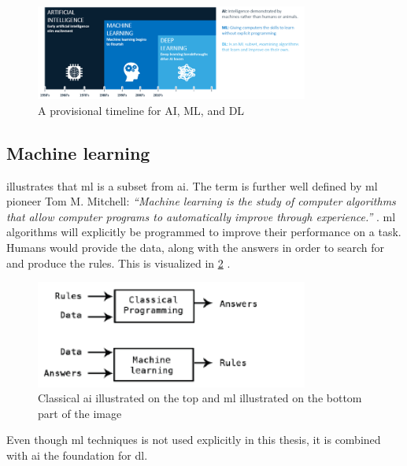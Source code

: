 \documentclass[USenglish]{ifimaster}  %
\begin{document}
\begin{figure}[ht]
    \centering
    \includegraphics[width=0.8\textwidth]{bilder/AI_ML_DL.png}
    \caption{A provisional timeline for AI, ML, and DL \cite{website:AI}}
    \label{fig:AI}
\end{figure}

\subsection{Machine learning}
 illustrates that \ac{ml} is a subset from \ac{ai}. The term is further well defined by \ac{ml} pioneer Tom M. Mitchell:
\newline
\newline
\textit{“Machine learning is the study of computer algorithms that allow computer programs to automatically improve through experience.”} \cite{tom_mitchell}.
\newline
\newline
\ac{ml} algorithms will explicitly be programmed to improve their performance on a task. Humans would provide the data, along with the answers in order to search for and produce the rules. This is visualized in \cref{fig:ml} \cite{Francois_Deep_learning_with_python}.
\begin{figure}[ht]
    \centering
    \includegraphics[width=0.8\textwidth]{bilder/ml.png}
    \caption{Classical \ac{ai} illustrated on the top and \ac{ml} illustrated on the bottom part of the image \cite{Francois_Deep_learning_with_python}}
    \label{fig:ml}
\end{figure}

Even though \ac{ml} techniques is not used explicitly in this thesis, it is combined with \ac{ai} the foundation for \ac{dl}.
\end{document}
